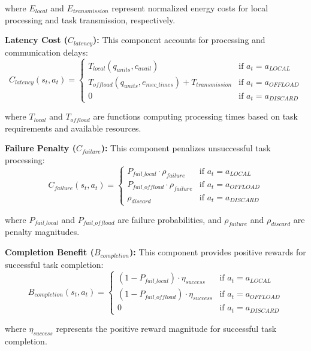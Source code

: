 \documentclass[journal]{IEEEtran}
\begin{document}
where $E_{local}$ and $E_{transmission}$ represent normalized energy costs for local processing and task transmission, respectively.

\textbf{Latency Cost ($C_{latency}$):} This component accounts for processing and communication delays:
\begin{equation}
C_{latency}(s_t, a_t) = \begin{cases}
T_{local}(q_{units}, c_{avail}) & \text{if } a_t = a_{LOCAL} \\
T_{offload}(q_{units}, e_{mec\_times}) + T_{transmission} & \text{if } a_t = a_{OFFLOAD} \\
0 & \text{if } a_t = a_{DISCARD}
\end{cases}
\end{equation}

where $T_{local}$ and $T_{offload}$ are functions computing processing times based on task requirements and available resources.

\textbf{Failure Penalty ($C_{failure}$):} This component penalizes unsuccessful task processing:
\begin{equation}
C_{failure}(s_t, a_t) = \begin{cases}
P_{fail\_local} \cdot \rho_{failure} & \text{if } a_t = a_{LOCAL} \\
P_{fail\_offload} \cdot \rho_{failure} & \text{if } a_t = a_{OFFLOAD} \\
\rho_{discard} & \text{if } a_t = a_{DISCARD}
\end{cases}
\end{equation}

where $P_{fail\_local}$ and $P_{fail\_offload}$ are failure probabilities, and $\rho_{failure}$ and $\rho_{discard}$ are penalty magnitudes.

\textbf{Completion Benefit ($B_{completion}$):} This component provides positive rewards for successful task completion:
\begin{equation}
B_{completion}(s_t, a_t) = \begin{cases}
(1 - P_{fail\_local}) \cdot \eta_{success} & \text{if } a_t = a_{LOCAL} \\
(1 - P_{fail\_offload}) \cdot \eta_{success} & \text{if } a_t = a_{OFFLOAD} \\
0 & \text{if } a_t = a_{DISCARD}
\end{cases}
\end{equation}

where $\eta_{success}$ represents the positive reward magnitude for successful task completion.
\end{document}
